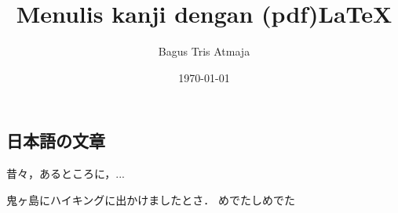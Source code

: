 \documentclass[a4paper]{article}
\title{Menulis kanji dengan (pdf)\LaTeX}
\author{Bagus Tris Atmaja}
\date{\today}
\begin{document}
\begin{CJK*}{UTF8}{min}

	\maketitle
	\section{日本語の文章}
		昔々，あるところに，...

		鬼ヶ島にハイキングに出かけましたとさ．
		めでたしめでた
\end{CJK*}
\end{document}
